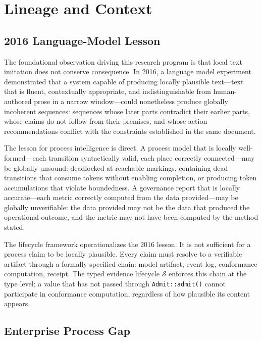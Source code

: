 
\section{Lineage and Context}
\label{sec:lifecycle-lineage}

\subsection{2016 Language-Model Lesson}
\label{sec:lifecycle-lineage-2016}

The foundational observation driving this research program is that local text imitation
does not conserve consequence. In 2016, a language model experiment demonstrated that a
system capable of producing locally plausible text---text that is fluent, contextually
appropriate, and indistinguishable from human-authored prose in a narrow window---could
nonetheless produce globally incoherent sequences: sequences whose later parts contradict
their earlier parts, whose claims do not follow from their premises, and whose action
recommendations conflict with the constraints established in the same document.

The lesson for process intelligence is direct. A process model that is locally
well-formed---each transition syntactically valid, each place correctly connected---may
be globally unsound: deadlocked at reachable markings, containing dead transitions that
consume tokens without enabling completion, or producing token accumulations that
violate boundedness. A governance report that is locally accurate---each metric correctly
computed from the data provided---may be globally unverifiable: the data provided may not
be the data that produced the operational outcome, and the metric may not have been
computed by the method stated.

The lifecycle framework operationalizes the 2016 lesson. It is not sufficient for a
process claim to be locally plausible. Every claim must resolve to a verifiable artifact
through a formally specified chain: model artifact, event log, conformance computation,
receipt. The typed evidence lifecycle $\mathcal{S}$ enforces this chain at the type level;
a value that has not passed through \texttt{Admit::admit()} cannot participate in
conformance computation, regardless of how plausible its content appears.

\subsection{Enterprise Process Gap}
\label{sec:lifecycle-lineage-gap}

